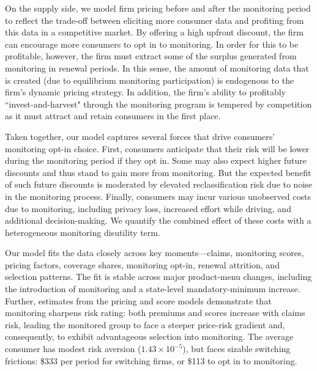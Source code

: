 On the supply side, we model firm pricing before and after the monitoring period to reflect the trade-off between eliciting more consumer data and profiting from this data in a competitive market. By offering a high upfront discount, the firm can encourage more consumers to opt in to monitoring. In order for this to be profitable, however, the firm must extract some of the surplus generated from monitoring in renewal periods. In this sense, the amount of monitoring data that is created (due to equilibrium monitoring participation) is endogenous to the firm's dynamic pricing strategy. In addition, the firm's ability to profitably ``invest-and-harvest" through the monitoring program is tempered by competition as it must attract and retain consumers in the first place.

Taken together, our model captures several forces that drive consumers' monitoring opt-in choice. First, consumers anticipate that their risk will be lower during the monitoring period if they opt in. Some may also expect higher future discounts and thus stand to gain more from monitoring. But the expected benefit of such future discounts is moderated by elevated reclassification risk due to noise in the monitoring process. Finally, consumers may incur various unobserved costs due to monitoring, including privacy loss, increased effort while driving, and additional decision-making. We quantify the combined effect of these costs with a heterogeneous monitoring disutility term.

Our model fits the data closely across key moments---claims, monitoring scores, pricing factors, coverage shares, monitoring opt-in, renewal attrition, and selection patterns.
The fit is stable across major product-menu changes, including the introduction of monitoring and a state-level mandatory-minimum increase.
Further, estimates from the pricing and score models demonstrate that monitoring sharpens risk rating: both premiums and scores increase with claims risk, leading the monitored group to face a steeper price-risk gradient and, consequently, to exhibit advantageous selection into monitoring.
The average consumer has modest risk aversion ($1.43\times10^{-5}$), but faces sizable switching frictions: \$333 per period for switching firms, or \$113 to opt in to monitoring.

